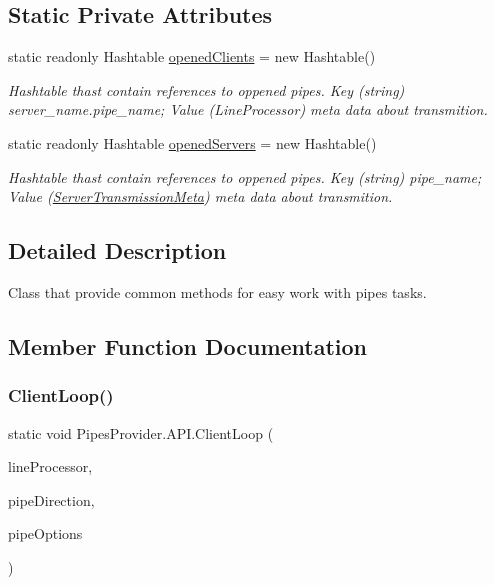 \subsection*{Static Private Attributes}
\begin{DoxyCompactItemize}
\item 
static readonly Hashtable \mbox{\hyperlink{class_pipes_provider_1_1_a_p_i_a8efe588e9c6f7bf610310d9f6223a0f8}{opened\+Clients}} = new Hashtable()
\begin{DoxyCompactList}\small\item\em Hashtable thast contain references to oppened pipes. Key (string) server\+\_\+name.\+pipe\+\_\+name; Value (Line\+Processor) meta data about transmition. \end{DoxyCompactList}\item 
static readonly Hashtable \mbox{\hyperlink{class_pipes_provider_1_1_a_p_i_ae5d6ee8740cc704d7ac5fc619349b603}{opened\+Servers}} = new Hashtable()
\begin{DoxyCompactList}\small\item\em Hashtable thast contain references to oppened pipes. Key (string) pipe\+\_\+name; Value (\mbox{\hyperlink{class_pipes_provider_1_1_server_transmission_meta}{Server\+Transmission\+Meta}}) meta data about transmition. \end{DoxyCompactList}\end{DoxyCompactItemize}


\subsection{Detailed Description}
Class that provide common methods for easy work with pipes\textquotesingle{} tasks. 



\subsection{Member Function Documentation}
\mbox{\label{class_pipes_provider_1_1_a_p_i_aaccf777b3b489b550739dd8adcf4a1d3}} 
\subsubsection{\texorpdfstring{Client\+Loop()}{ClientLoop()}}
{\footnotesize\ttfamily static void Pipes\+Provider.\+A\+P\+I.\+Client\+Loop (\begin{DoxyParamCaption}\item[{\mbox{\hyperlink{class_pipes_provider_1_1_transmission_line}{Transmission\+Line}}}]{line\+Processor,  }\item[{Pipe\+Direction}]{pipe\+Direction,  }\item[{Pipe\+Options}]{pipe\+Options }\end{DoxyParamCaption})\hspace{0.3cm}{\ttfamily [static]}}



